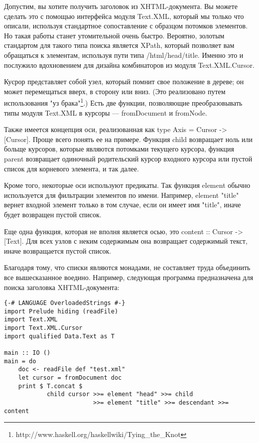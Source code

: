 Допустим, вы хотите получить заголовок из XHTML-документа. Вы можете сделать это с помощью интерфейса модуля Text.XML, который мы только что описали, используя стандартное сопоставление с образцом потомков элементов. Но такая работы станет утомительной очень быстро. Вероятно, золотым стандартом для такого типа поиска является XPath, который позволяет вам обращаться к элементам, используя пути типа /html/head/title. Именно это и послужило вдохновением для дизайна комбинаторов из модуля Text.XML.Cursor.

Кусрор представляет собой узел, который помнит свое положение в дереве; он может перемещаться вверх, в сторону или вниз. (Это реализовано путем использования "уз брака"\footnote{http://www.haskell.org/haskellwiki/Tying_the_Knot}.) Есть две функции, позволяющие преобразовывать типы модуля Text.XML в курсоры --- fromDocument и fromNode.

Также имеется концепция оси, реализованная как type Axis = Cursor -> [Cursor]. Проще всего понять ее на примере. Функция child возвращает ноль или больще курсоров, которые являются потомками текущего курсора, функция parent возвращает одиночный родительский курсор входного курсора или пустой список для корневого элемента, и так далее.

Кроме того, некоторые оси используют предикаты. Так функция element обычно используется для фильтрации элементов по имени. Например, element "title" вернет входной элемент только в том случае, если он имеет имя "title", иначе будет возвращен пустой список.

Еще одна функция, которая не вполня является осью, это content :: Cursor -> [Text]. Для всех узлов с неким содержимым она возвращает содержимый текст, иначе возвращается пустой список.

Благодаря тому, что списки являются монадами, не составляет труда объединить все вышесказанное воедино. Например, следующая программа предназначена для поиска заголовка XHTML-документа:

\begin{lstlisting}
{-# LANGUAGE OverloadedStrings #-}
import Prelude hiding (readFile)
import Text.XML
import Text.XML.Cursor
import qualified Data.Text as T

main :: IO ()
main = do
    doc <- readFile def "test.xml"
    let cursor = fromDocument doc
    print $ T.concat $
            child cursor >>= element "head" >>= child
                         >>= element "title" >>= descendant >>= content
\end{lstlisting}

